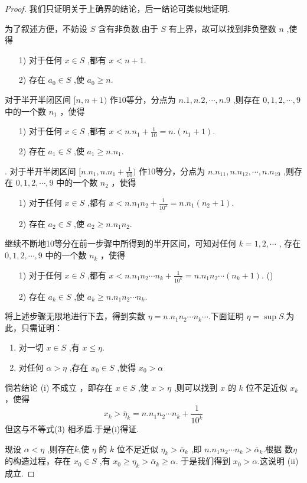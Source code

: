 \begin{proof}
    \renewcommand{\theenumi}{\roman{enumi}}
    \renewcommand{\labelenumi}{\normalfont (\theenumi)}
    我们只证明关于上确界的结论，后一结论可类似地证明.

    为了叙述方便，不妨设 $S$ 含有非负数.由于 $S$ 有上界，故可以找到非负整数 $n$ ,使得
    \begin{enumerate}
        \item[1)] 对于任何 $x\in S$ ,都有 $x<n+1$.
        \item[2)] 存在 $a_0\in S$ ,使 $a_0\ge n$.
    \end{enumerate}
    对于半开半闭区间 $[n,n+1)$ 作10等分，分点为 $n.1,n.2,\cdots,n.9$ ,则存在 $0,1,2,\cdots,9$ 中的一个数 $n_1$ ，使得 
    \begin{enumerate}
        \item[1)] 对于任何 $x\in S$ ,都有 $x<n.n_1+\frac{1}{10}=n.(n_1+1)$.
        \item[2)] 存在 $a_1\in S$ ,使 $a_1\ge n.n_1$.
    \end{enumerate}.
    对于半开半闭区间 $[n.n_1,n.n_1+\frac{1}{10})$ 作10等分，分点为 $n.n_11,n.n_12,\cdots,n.n_19$ ,则存在 $0,1,2,\cdots,9$ 中的一个数 $n_2$ ，使得 
    \begin{enumerate}
        \item[1)] 对于任何 $x\in S$ ,都有 $x<n.n_1n_2+\frac{1}{10^2}=n.n_1(n_2+1)$.
        \item[2)] 存在 $a_2\in S$ ,使 $a_2\ge n.n_1n_2$.
    \end{enumerate}
    继续不断地10等分在前一步骤中所得到的半开区间，可知对任何 $k=1,2,\cdots$ ,
    存在 $0,1,2,\cdots,9$ 中的一个数 $n_k$ ，使得 
    \begin{enumerate}
        \item[1)] 对于任何 $x\in S$ ,都有 $x<n.n_1n_2\cdots n_k+\frac{1}{10^k}=n.n_1n_2\cdots(n_k+1)$. \hfill (\theequation)
        \item[2)] 存在 $a_k\in S$ ,使 $a_k\ge n.n_1n_2\cdots n_k$.
    \end{enumerate}
    
    将上述步骤无限地进行下去，得到实数 $\eta=n.n_1n_2\cdots n_k\cdots$.下面证明 $\eta=\sup S$.为此，只需证明：
    \begin{enumerate}
        \item 对一切 $x\in S$ ,有 $x\le \eta$.
        \item 对任何 $\alpha>\eta$ ,存在 $x_0\in S$ ,使得 $x_0> \alpha$
    \end{enumerate}
    倘若结论 (i) 不成立 ，即存在 $x\in S$ ,使 $x>\eta$ ,则可以找到 $x$ 的 $k$ 位不足近似 $x_k$ ，使得
    \[
    x_k > \bar \eta_k = n.n_1n_2\cdots n_k+\frac{1}{10^k}
    \]
    但这与不等式(3) 相矛盾.于是(i)得证.

    现设 $\alpha<\eta$ ,则存在$k$,使 $\eta$ 的 $k$ 位不足近似 $\eta_k>\bar \alpha_k$ ,即 $n.n_1n_2\cdots n_k>\bar \alpha_k$.根据 数$\eta$ 的构造过程，存在 $x_0\in S$ ,有 $x_0 \ge \eta_k > \bar \alpha_k \ge \alpha$. 于是我们得到 $x_0>\alpha$.这说明 (ii) 成立.
\end{proof}

